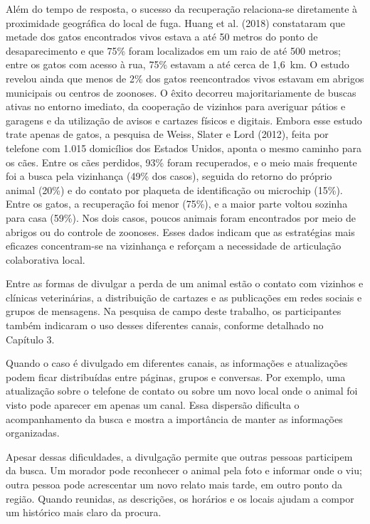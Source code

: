 Além do tempo de resposta, o sucesso da recuperação relaciona-se diretamente à proximidade geográfica do local de fuga. Huang et al. (2018) constataram que metade dos gatos encontrados vivos estava a até 50 metros do ponto de desaparecimento e que 75\% foram localizados em um raio de até 500 metros; entre os gatos com acesso à rua, 75\% estavam a até cerca de 1,6~km. O estudo revelou ainda que menos de 2\% dos gatos reencontrados vivos estavam em abrigos municipais ou centros de zoonoses. O êxito decorreu majoritariamente de buscas ativas no entorno imediato, da cooperação de vizinhos para averiguar pátios e garagens e da utilização de avisos e cartazes físicos e digitais. Embora esse estudo trate apenas de gatos, a pesquisa de Weiss, Slater e Lord (2012), feita por telefone com 1.015 domicílios dos Estados Unidos, aponta o mesmo caminho para os cães. Entre os cães perdidos, 93\% foram recuperados, e o meio mais frequente foi a busca pela vizinhança (49\% dos casos), seguida do retorno do próprio animal (20\%) e do contato por plaqueta de identificação ou microchip (15\%). Entre os gatos, a recuperação foi menor (75\%), e a maior parte voltou sozinha para casa (59\%). Nos dois casos, poucos animais foram encontrados por meio de abrigos ou do controle de zoonoses. Esses dados indicam que as estratégias mais eficazes concentram-se na vizinhança e reforçam a necessidade de articulação colaborativa local.

Entre as formas de divulgar a perda de um animal estão o contato com vizinhos e clínicas veterinárias, a distribuição de cartazes e as publicações em redes sociais e grupos de mensagens. Na pesquisa de campo deste trabalho, os participantes também indicaram o uso desses diferentes canais, conforme detalhado no Capítulo 3.

Quando o caso é divulgado em diferentes canais, as informações e atualizações podem ficar distribuídas entre páginas, grupos e conversas. Por exemplo, uma atualização sobre o telefone de contato ou sobre um novo local onde o animal foi visto pode aparecer em apenas um canal. Essa dispersão dificulta o acompanhamento da busca e mostra a importância de manter as informações organizadas.

Apesar dessas dificuldades, a divulgação permite que outras pessoas participem da busca. Um morador pode reconhecer o animal pela foto e informar onde o viu; outra pessoa pode acrescentar um novo relato mais tarde, em outro ponto da região. Quando reunidas, as descrições, os horários e os locais ajudam a compor um histórico mais claro da procura.

